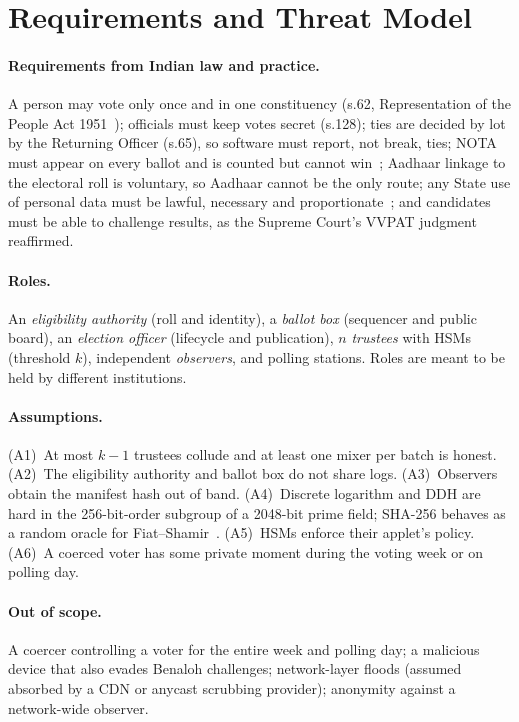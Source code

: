 \documentclass[runningheads]{llncs}
\begin{document}
\section{Requirements and Threat Model}\label{sec:threat}

\paragraph{Requirements from Indian law and practice.} A person may vote only once and in one constituency (s.62, Representation of the People Act 1951~\cite{rpa1951}); officials must keep votes secret (s.128); ties are decided by lot by the Returning Officer (s.65), so software must report, not break, ties; NOTA must appear on every ballot and is counted but cannot win~\cite{pucl2013}; Aadhaar linkage to the electoral roll is voluntary, so Aadhaar cannot be the only route; any State use of personal data must be lawful, necessary and proportionate~\cite{puttaswamy2017,dpdp2023}; and candidates must be able to challenge results, as the Supreme Court's VVPAT judgment~\cite{adr2024} reaffirmed.

\paragraph{Roles.} An \emph{eligibility authority} (roll and identity), a \emph{ballot box} (sequencer and public board), an \emph{election officer} (lifecycle and publication), $n$ \emph{trustees} with HSMs (threshold $k$), independent \emph{observers}, and polling stations. Roles are meant to be held by different institutions.

\paragraph{Assumptions.} (A1)~At most $k-1$ trustees collude and at least one mixer per batch is honest. (A2)~The eligibility authority and ballot box do not share logs. (A3)~Observers obtain the manifest hash out of band. (A4)~Discrete logarithm and DDH are hard in the 256-bit-order subgroup of a 2048-bit prime field; SHA-256 behaves as a random oracle for Fiat--Shamir~\cite{fiatshamir1986}. (A5)~HSMs enforce their applet's policy. (A6)~A coerced voter has some private moment during the voting week or on polling day.

\paragraph{Out of scope.} A coercer controlling a voter for the entire week and polling day; a malicious device that also evades Benaloh challenges; network-layer floods (assumed absorbed by a CDN or anycast scrubbing provider); anonymity against a network-wide observer.
\end{document}
